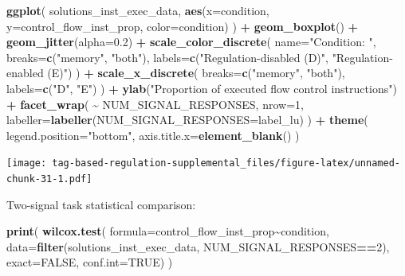 \documentclass[
]{book}
\newenvironment{Shaded}{\begin{snugshade}}{\end{snugshade}}
\newcommand{\DataTypeTok}[1]{\textcolor[rgb]{0.13,0.29,0.53}{#1}}
\newcommand{\DecValTok}[1]{\textcolor[rgb]{0.00,0.00,0.81}{#1}}
\newcommand{\FloatTok}[1]{\textcolor[rgb]{0.00,0.00,0.81}{#1}}
\newcommand{\KeywordTok}[1]{\textcolor[rgb]{0.13,0.29,0.53}{\textbf{#1}}}
\newcommand{\NormalTok}[1]{#1}
\newcommand{\OperatorTok}[1]{\textcolor[rgb]{0.81,0.36,0.00}{\textbf{#1}}}
\newcommand{\OtherTok}[1]{\textcolor[rgb]{0.56,0.35,0.01}{#1}}
\newcommand{\StringTok}[1]{\textcolor[rgb]{0.31,0.60,0.02}{#1}}
\begin{document}
\begin{Shaded}
\begin{Highlighting}[]
\KeywordTok{ggplot}\NormalTok{( solutions\_inst\_exec\_data, }\KeywordTok{aes}\NormalTok{(}\DataTypeTok{x=}\NormalTok{condition, }\DataTypeTok{y=}\NormalTok{control\_flow\_inst\_prop, }\DataTypeTok{color=}\NormalTok{condition) ) }\OperatorTok{+}
\StringTok{  }\KeywordTok{geom\_boxplot}\NormalTok{() }\OperatorTok{+}
\StringTok{  }\KeywordTok{geom\_jitter}\NormalTok{(}\DataTypeTok{alpha=}\FloatTok{0.2}\NormalTok{) }\OperatorTok{+}
\StringTok{  }\KeywordTok{scale\_color\_discrete}\NormalTok{(}
    \DataTypeTok{name=}\StringTok{"Condition: "}\NormalTok{,}
    \DataTypeTok{breaks=}\KeywordTok{c}\NormalTok{(}\StringTok{"memory"}\NormalTok{, }\StringTok{"both"}\NormalTok{),}
    \DataTypeTok{labels=}\KeywordTok{c}\NormalTok{(}\StringTok{"Regulation{-}disabled (D)"}\NormalTok{, }\StringTok{"Regulation{-}enabled (E)"}\NormalTok{)}
\NormalTok{  ) }\OperatorTok{+}
\StringTok{  }\KeywordTok{scale\_x\_discrete}\NormalTok{(}
    \DataTypeTok{breaks=}\KeywordTok{c}\NormalTok{(}\StringTok{"memory"}\NormalTok{, }\StringTok{"both"}\NormalTok{),}
    \DataTypeTok{labels=}\KeywordTok{c}\NormalTok{(}\StringTok{"D"}\NormalTok{, }\StringTok{"E"}\NormalTok{)}
\NormalTok{  ) }\OperatorTok{+}
\StringTok{  }\KeywordTok{ylab}\NormalTok{(}\StringTok{"Proportion of executed flow control instructions"}\NormalTok{) }\OperatorTok{+}
\StringTok{  }\KeywordTok{facet\_wrap}\NormalTok{(}
    \OperatorTok{\textasciitilde{}}\StringTok{ }\NormalTok{NUM\_SIGNAL\_RESPONSES,}
    \DataTypeTok{nrow=}\DecValTok{1}\NormalTok{,}
    \DataTypeTok{labeller=}\KeywordTok{labeller}\NormalTok{(}\DataTypeTok{NUM\_SIGNAL\_RESPONSES=}\NormalTok{label\_lu)}
\NormalTok{  ) }\OperatorTok{+}
\StringTok{  }\KeywordTok{theme}\NormalTok{(}
    \DataTypeTok{legend.position=}\StringTok{"bottom"}\NormalTok{,}
    \DataTypeTok{axis.title.x=}\KeywordTok{element\_blank}\NormalTok{()}
\NormalTok{  )}
\end{Highlighting}
\end{Shaded}

\texttt{[image: tag-based-regulation-supplemental\_files/figure-latex/unnamed-chunk-31-1.pdf]}

Two-signal task statistical comparison:

\begin{Shaded}
\begin{Highlighting}[]
\KeywordTok{print}\NormalTok{(}
  \KeywordTok{wilcox.test}\NormalTok{(}
    \DataTypeTok{formula=}\NormalTok{control\_flow\_inst\_prop}\OperatorTok{\textasciitilde{}}\NormalTok{condition,}
    \DataTypeTok{data=}\KeywordTok{filter}\NormalTok{(solutions\_inst\_exec\_data, NUM\_SIGNAL\_RESPONSES}\OperatorTok{==}\DecValTok{2}\NormalTok{),}
    \DataTypeTok{exact=}\OtherTok{FALSE}\NormalTok{,}
    \DataTypeTok{conf.int=}\OtherTok{TRUE}\NormalTok{)}
\NormalTok{)}
\end{Highlighting}
\end{Shaded}
\end{document}

